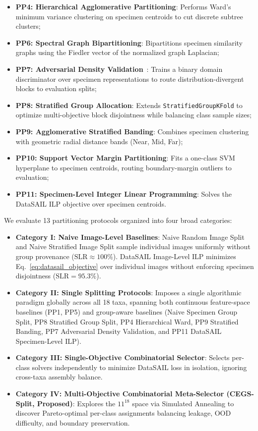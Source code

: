 \documentclass[a4paper,fleqn]{cas-sc}
\begin{document}
\begin{itemize}
\begin{itemize}
  \item \textbf{PP4: Hierarchical Agglomerative Partitioning}: Performs Ward's minimum variance clustering on specimen centroids to cut discrete subtree clusters;
  \item \textbf{PP6: Spectral Graph Bipartitioning}: Bipartitions specimen similarity graphs using the Fiedler vector of the normalized graph Laplacian;
  \item \textbf{PP7: Adversarial Density Validation}~\cite{adversarialvalidation}: Trains a binary domain discriminator over specimen representations to route distribution-divergent blocks to evaluation splits;
  \item \textbf{PP8: Stratified Group Allocation}: Extends \texttt{StratifiedGroupKFold} to optimize multi-objective block disjointness while balancing class sample sizes;
  \item \textbf{PP9: Agglomerative Stratified Banding}: Combines specimen clustering with geometric radial distance bands (Near, Mid, Far);
  \item \textbf{PP10: Support Vector Margin Partitioning}: Fits a one-class SVM hyperplane to specimen centroids, routing boundary-margin outliers to evaluation;
  \item \textbf{PP11: Specimen-Level Integer Linear Programming}: Solves the DataSAIL ILP objective over specimen centroids.
  \end{itemize}
\end{itemize}

We evaluate 13 partitioning protocols organized into four broad categories:
\begin{itemize}
\item \textbf{Category I: Naive Image-Level Baselines}: \textsf{Naive Random Image Split} and \textsf{Naive Stratified Image Split} sample individual images uniformly without group provenance ($\mathrm{SLR} \approx 100\%$). \textsf{DataSAIL Image-Level ILP} minimizes Eq.~\eqref{eq:datasail_objective} over individual images without enforcing specimen disjointness ($\mathrm{SLR} = 95.3\%$).
\item \textbf{Category II: Single Splitting Protocols}: Imposes a single algorithmic paradigm globally across all 18 taxa, spanning both continuous feature-space baselines (PP1, PP5) and group-aware baselines (Naive Specimen Group Split, PP8 Stratified Group Split, PP4 Hierarchical Ward, PP9 Stratified Banding, PP7 Adversarial Density Validation, and PP11 DataSAIL Specimen-Level ILP).
\item \textbf{Category III: Single-Objective Combinatorial Selector}: Selects per-class solvers independently to minimize DataSAIL loss in isolation, ignoring cross-taxa assembly balance.
\item \textbf{Category IV: Multi-Objective Combinatorial Meta-Selector (CEGS-Split, Proposed)}: Explores the $11^{18}$ space via Simulated Annealing to discover Pareto-optimal per-class assignments balancing leakage, OOD difficulty, and boundary preservation.
\end{itemize}
\end{document}
